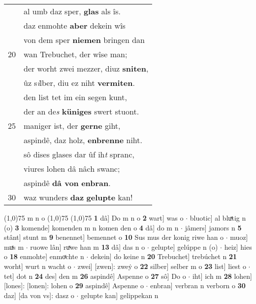 \documentclass[8pt,a4paper,notitlepage]{article}
\begin{document}
\begin{table}[ht]
\begin{minipage}[t]{0.5\linewidth}
\begin{tabular}{rl}
 & al umb daz sper, \textbf{glas} als îs.\\ 
 & daz enmohte \textbf{aber} dekein wîs\\ 
 & von dem sper \textbf{niemen} bringen dan\\ 
20 & wan Trebuchet, der wîse man;\\ 
 & der worht zwei mezzer, diuz \textbf{sniten},\\ 
 & ûz s\textit{i}lber, diu ez niht \textbf{vermiten}.\\ 
 & den list tet im ein segen kunt,\\ 
 & der an de\textit{s} \textbf{küniges} swert stuont.\\ 
25 & maniger ist, der \textbf{gerne} giht,\\ 
 & aspindê, daz holz, \textbf{enbrenne} niht.\\ 
 & sô dises glases dar ûf ih\textit{t} spranc,\\ 
 & viures lohen dâ nâch swanc;\\ 
 & aspindê \textbf{dâ von} \textbf{enbran}.\\ 
30 & waz wunders \textbf{daz} \textbf{gelupte} kan!\\ 
\end{tabular}
\scriptsize
\line(1,0){75} \newline
m n o \newline
\line(1,0){75} \newline
\newline
\line(1,0){75} \newline
\textbf{1} dâ] Do m n o \textbf{2} wart] was o  $\cdot$ bluotic] al bluͯtig n (o) \textbf{3} komende] komenden m n komen den o \textbf{4} dâ] do m n  $\cdot$ jâmers] jamors n \textbf{5} stânt] stunt m \textbf{9} benennet] bemennet o \textbf{10} Sus mus der konig riwe han o  $\cdot$ muoz] muͯs m  $\cdot$ ruowe lân] ruͯwe han m \textbf{13} dâ] das n o  $\cdot$ gelupte] gelúppe n (o)  $\cdot$ heiz] hies o \textbf{18} enmohte] enmoͯchte n  $\cdot$ dekein] do keine n \textbf{20} Trebuchet] trebúchet n \textbf{21} worht] wurt n wacht o  $\cdot$ zwei] [zwen]: zweẏ o \textbf{22} silber] selber m o \textbf{23} list] liest o  $\cdot$ tet] dot n \textbf{24} des] den m \textbf{26} aspindê] Aspenne o \textbf{27} sô] Do o  $\cdot$ iht] ich m \textbf{28} lohen] [lones]: [lonen]: lohen o \textbf{29} aspindê] Aspenne o  $\cdot$ enbran] verbran n verborn o \textbf{30} daz] [da von vs]: dasz o  $\cdot$ gelupte kan] gelippekan n \newline
\end{minipage}
\end{table}
\end{document}
